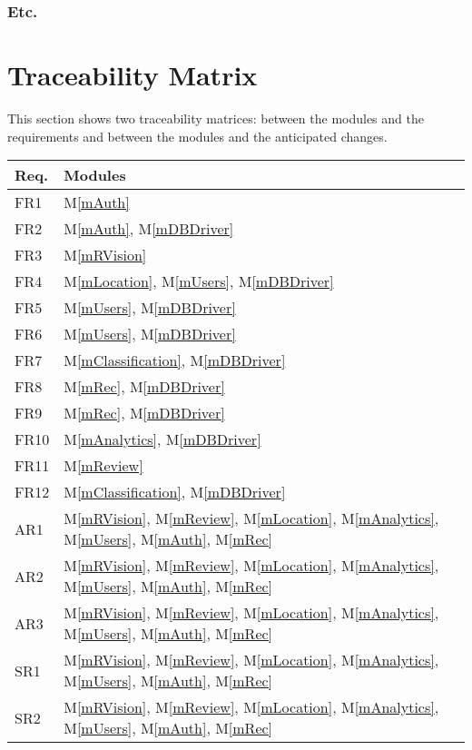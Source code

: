 \documentclass[12pt, titlepage]{article}
\newcommand{\mref}[1]{M\ref{#1}}
\begin{document}
\subsubsection{Etc.}

\section{Traceability Matrix} \label{SecTM}

This section shows two traceability matrices: between the modules and the
requirements and between the modules and the anticipated changes.

\begin{longtable}{p{} p{}}
\toprule
\textbf{Req.} & \textbf{Modules}\\
\midrule
FR1 & \mref{mAuth}\\
FR2 & \mref{mAuth}, \mref{mDBDriver}\\
FR3 & \mref{mRVision}\\
FR4 & \mref{mLocation}, \mref{mUsers}, \mref{mDBDriver}\\
FR5 & \mref{mUsers}, \mref{mDBDriver}\\
FR6 & \mref{mUsers}, \mref{mDBDriver}\\
FR7 & \mref{mClassification}, \mref{mDBDriver}\\
FR8 & \mref{mRec}, \mref{mDBDriver}\\
FR9 & \mref{mRec}, \mref{mDBDriver}\\
FR10 & \mref{mAnalytics}, \mref{mDBDriver}\\
FR11 & \mref{mReview}\\
FR12 & \mref{mClassification}, \mref{mDBDriver}\\
AR1 & \mref{mRVision}, \mref{mReview}, \mref{mLocation}, \mref{mAnalytics}, \mref{mUsers}, \mref{mAuth}, \mref{mRec}\\
AR2 & \mref{mRVision}, \mref{mReview}, \mref{mLocation}, \mref{mAnalytics}, \mref{mUsers}, \mref{mAuth}, \mref{mRec}\\
AR3 & \mref{mRVision}, \mref{mReview}, \mref{mLocation}, \mref{mAnalytics}, \mref{mUsers}, \mref{mAuth}, \mref{mRec}\\
SR1 & \mref{mRVision}, \mref{mReview}, \mref{mLocation}, \mref{mAnalytics}, \mref{mUsers}, \mref{mAuth}, \mref{mRec}\\
SR2 & \mref{mRVision}, \mref{mReview}, \mref{mLocation}, \mref{mAnalytics}, \mref{mUsers}, \mref{mAuth}, \mref{mRec}\\

\end{longtable}
\end{document}
